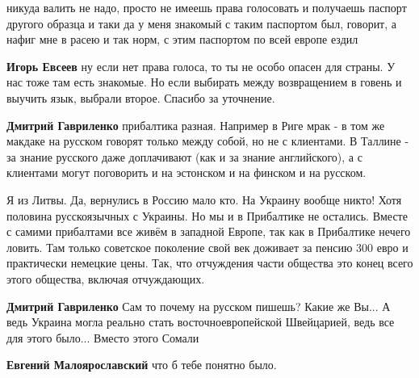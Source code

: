 \begin{itemize}
\begin{itemize}
никуда валить не надо, просто не имеешь права голосовать и получаешь паспорт
другого образца и таки да у меня знакомый с таким паспортом был, говорит, а
нафиг мне в расею и так норм, с этим паспортом по всей европе ездил



\textbf{Игорь Евсеев} ну если нет права голоса, то ты не особо опасен для страны. У нас тоже там есть знакомые. Но если выбирать между возвращением в говень и выучить язык, выбрали второе.
Спасибо за уточнение.


\textbf{Дмитрий Гавриленко} прибалтика разная. Например в Риге мрак - в том же макдаке на русском говорят только между собой, но не с клиентами. В Таллине - за знание русского даже доплачивают (как и за знание английского), а с клиентами могут поговорить и на эстонском и на финском и на русском.



Я из Литвы. Да, вернулись в Россию мало кто. На Украину вообще никто! Хотя
половина русскоязычных с Украины. Но мы и в Прибалтике не остались. Вместе с
самими прибалтами все живём в западной Европе, так как в Прибалтике нечего
ловить. Там только советское поколение свой век доживает за пенсию 300 евро и
практически немецкие цены. Так, что отчуждения части общества это конец всего
этого общества, включая отчуждающих.



\textbf{Дмитрий Гавриленко} Сам то почему на русском пишешь? Какие же Вы... А
ведь Украина могла реально стать восточноевропейской Швейцарией, ведь все для
этого было... Вместо этого Сомали


\textbf{Евгений Малоярославский} что б тебе понятно было.
\end{itemize}




\end{itemize}
